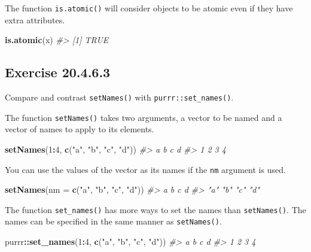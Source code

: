 \documentclass[]{book}
\newenvironment{Shaded}{\begin{snugshade}}{\end{snugshade}}
\newcommand{\CommentTok}[1]{\textcolor[rgb]{0.56,0.35,0.01}{\textit{#1}}}
\newcommand{\DataTypeTok}[1]{\textcolor[rgb]{0.13,0.29,0.53}{#1}}
\newcommand{\DecValTok}[1]{\textcolor[rgb]{0.00,0.00,0.81}{#1}}
\newcommand{\KeywordTok}[1]{\textcolor[rgb]{0.13,0.29,0.53}{\textbf{#1}}}
\newcommand{\NormalTok}[1]{#1}
\newcommand{\OperatorTok}[1]{\textcolor[rgb]{0.81,0.36,0.00}{\textbf{#1}}}
\newcommand{\StringTok}[1]{\textcolor[rgb]{0.31,0.60,0.02}{#1}}
\theoremstyle{plain}
\theoremstyle{remark}
\begin{document}
The function \texttt{is.atomic()} will consider objects to be atomic
even if they have extra attributes.

\begin{Shaded}
\begin{Highlighting}[]
\KeywordTok{is.atomic}\NormalTok{(x)}
\CommentTok{#> [1] TRUE}
\end{Highlighting}
\end{Shaded}

\hypertarget{exercise-20.4.6.3}{%
\subsection*{\texorpdfstring{Exercise
{20.4.6.3}}{Exercise 20.4.6.3}}\label{exercise-20.4.6.3}}

Compare and contrast \texttt{setNames()} with
\texttt{purrr::set\_names()}.

The function \texttt{setNames()} takes two arguments, a vector to be
named and a vector of names to apply to its elements.

\begin{Shaded}
\begin{Highlighting}[]
\KeywordTok{setNames}\NormalTok{(}\DecValTok{1}\OperatorTok{:}\DecValTok{4}\NormalTok{, }\KeywordTok{c}\NormalTok{(}\StringTok{"a"}\NormalTok{, }\StringTok{"b"}\NormalTok{, }\StringTok{"c"}\NormalTok{, }\StringTok{"d"}\NormalTok{))}
\CommentTok{#> a b c d }
\CommentTok{#> 1 2 3 4}
\end{Highlighting}
\end{Shaded}

You can use the values of the vector as its names if the \texttt{nm}
argument is used.

\begin{Shaded}
\begin{Highlighting}[]
\KeywordTok{setNames}\NormalTok{(}\DataTypeTok{nm =} \KeywordTok{c}\NormalTok{(}\StringTok{"a"}\NormalTok{, }\StringTok{"b"}\NormalTok{, }\StringTok{"c"}\NormalTok{, }\StringTok{"d"}\NormalTok{))}
\CommentTok{#>   a   b   c   d }
\CommentTok{#> "a" "b" "c" "d"}
\end{Highlighting}
\end{Shaded}

The function \texttt{set\_names()} has more ways to set the names than
\texttt{setNames()}. The names can be specified in the same manner as
\texttt{setNames()}.

\begin{Shaded}
\begin{Highlighting}[]
\NormalTok{purrr}\OperatorTok{::}\KeywordTok{set_names}\NormalTok{(}\DecValTok{1}\OperatorTok{:}\DecValTok{4}\NormalTok{, }\KeywordTok{c}\NormalTok{(}\StringTok{"a"}\NormalTok{, }\StringTok{"b"}\NormalTok{, }\StringTok{"c"}\NormalTok{, }\StringTok{"d"}\NormalTok{))}
\CommentTok{#> a b c d }
\CommentTok{#> 1 2 3 4}
\end{Highlighting}
\end{Shaded}
\end{document}

